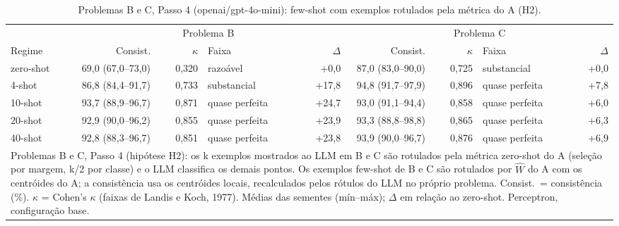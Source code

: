 \begin{table}[htbp]
\centering
\small
\caption{Problemas B e C, Passo 4 (openai/gpt-4o-mini): few-shot com exemplos rotulados pela métrica do A (H2).}
\label{tab:bloco1_BC_passo4_exemplos_da_metrica_gpt4mini}
\begin{tabular}{lrrlrrrlr}
\toprule
 & \multicolumn{4}{c}{Problema B} & \multicolumn{4}{c}{Problema C} \\ \cmidrule(lr){2-5} \cmidrule(lr){6-9}
Regime & Consist. & $\kappa$ & Faixa & $\Delta$ & Consist. & $\kappa$ & Faixa & $\Delta$ \\
\midrule
zero-shot & 69,0 (67,0–73,0) & 0,320 & razoável & +0,0 & 87,0 (83,0–90,0) & 0,725 & substancial & +0,0 \\
4-shot & 86,8 (84,4–91,7) & 0,733 & substancial & +17,8 & 94,8 (91,7–97,9) & 0,896 & quase perfeita & +7,8 \\
10-shot & 93,7 (88,9–96,7) & 0,871 & quase perfeita & +24,7 & 93,0 (91,1–94,4) & 0,858 & quase perfeita & +6,0 \\
20-shot & 92,9 (90,0–96,2) & 0,855 & quase perfeita & +23,9 & 93,3 (88,8–98,8) & 0,865 & quase perfeita & +6,3 \\
40-shot & 92,8 (88,3–96,7) & 0,851 & quase perfeita & +23,8 & 93,9 (90,0–96,7) & 0,876 & quase perfeita & +6,9 \\
\bottomrule
\multicolumn{9}{p{0.95\linewidth}}{\footnotesize Problemas B e C, Passo 4 (hipótese H2): os k exemplos mostrados ao LLM em B e C são rotulados pela métrica zero-shot do A (seleção por margem, k/2 por classe) e o LLM classifica os demais pontos. Os exemplos few-shot de B e C são rotulados por $\hat{W}$ do A com os centróides do A; a consistência usa os centróides locais, recalculados pelos rótulos do LLM no próprio problema. Consist.\ = consistência (\%). $\kappa$ = Cohen's $\kappa$ (faixas de Landis e Koch, 1977). Médias das sementes (mín–máx); $\Delta$ em relação ao zero-shot. Perceptron, configuração base.} \\
\end{tabular}
\end{table}
